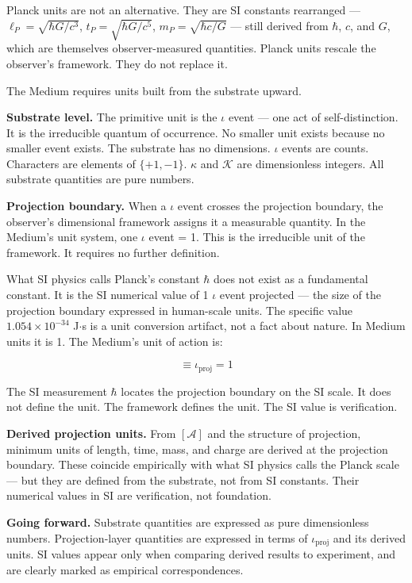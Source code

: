 \documentclass[11pt,letterpaper]{article}
\newcommand{\Kappa}{\mathcal{K}}
\begin{document}
Planck units are not an alternative. They are SI constants rearranged --- \(\ell_P = \sqrt{\hbar G / c^3}\), \(t_P = \sqrt{\hbar G / c^5}\), \(m_P = \sqrt{\hbar c / G}\) --- still derived from \(\hbar\), \(c\), and \(G\), which are themselves observer-measured quantities. Planck units rescale the observer's framework. They do not replace it.

The Medium requires units built from the substrate upward.

\textbf{Substrate level.} The primitive unit is the \(\iota\) event --- one act of self-distinction. It is the irreducible quantum of occurrence. No smaller unit exists because no smaller event exists. The substrate has no dimensions. \(\iota\) events are counts. Characters are elements of \(\{+1,-1\}\). \(\kappa\) and \(\Kappa\) are dimensionless integers. All substrate quantities are pure numbers.

\textbf{Projection boundary.} When a \(\iota\) event crosses the projection boundary, the observer's dimensional framework assigns it a measurable quantity. In the Medium's unit system, one \(\iota\) event = 1. This is the irreducible unit of the framework. It requires no further definition.

What SI physics calls Planck's constant \(\hbar\) does not exist as a fundamental constant. It is the SI numerical value of 1 \(\iota\) event projected --- the size of the projection boundary expressed in human-scale units. The specific value \(1.054 \times 10^{-34}\) J\(\cdot\)s is a unit conversion artifact, not a fact about nature. In Medium units it is 1. The Medium's unit of action is:

\begin{equation}
[\mathcal{A}] \equiv \iota_{\mathrm{proj}} = 1
\end{equation}

The SI measurement \(\hbar\) locates the projection boundary on the SI scale. It does not define the unit. The framework defines the unit. The SI value is verification.

\textbf{Derived projection units.} From \([\mathcal{A}]\) and the structure of projection, minimum units of length, time, mass, and charge are derived at the projection boundary. These coincide empirically with what SI physics calls the Planck scale --- but they are defined from the substrate, not from SI constants. Their numerical values in SI are verification, not foundation.

\textbf{Going forward.} Substrate quantities are expressed as pure dimensionless numbers. Projection-layer quantities are expressed in terms of \(\iota_{\mathrm{proj}}\) and its derived units. SI values appear only when comparing derived results to experiment, and are clearly marked as empirical correspondences.
\end{document}
